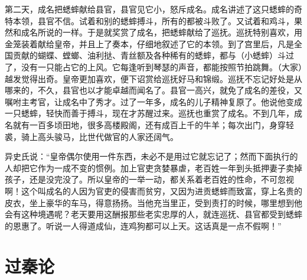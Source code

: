 \documentclass[12pt,UTF-8,openany,a4]{ctexbook}
\begin{document}
\begin{large}
    第二天，成名把蟋蟀献给县官，县官见它小，怒斥成名。成名讲述了这只蟋蟀的奇特本领，县官不信。试着和别的蟋蟀搏斗，所有的都被斗败了。又试着和鸡斗，果然和成名所说的一样。于是就奖赏了成名，把蟋蟀献给了巡抚。巡抚特别喜欢，用金笼装着献给皇帝，并且上了奏本，仔细地叙述了它的本领。到了宫里后，凡是全国贡献的蝴蝶、螳螂、油利挞、青丝额及各种稀有的蟋蟀，都与（小蟋蟀）斗过了，没有一只能占它的上风。它每逢听到琴瑟的声音，都能按照节拍跳舞。（大家）越发觉得出奇。皇帝更加喜欢，便下诏赏给巡抚好马和锦缎。巡抚不忘记好处是从哪来的，不久，县官也以才能卓越而闻名了。县官一高兴，就免了成名的差役，又嘱咐主考官，让成名中了秀才。过了一年多，成名的儿子精神复原了。他说他变成一只蟋蟀，轻快而善于搏斗，现在才苏醒过来。巡抚也重赏了成名。不到几年，成名就有一百多顷田地，很多高楼殿阁，还有成百上千的牛羊；每次出门，身穿轻裘，骑上高头骏马，比世代做官的人家还阔气。
    
    异史氏说：“皇帝偶尔使用一件东西，未必不是用过它就忘记了；然而下面执行的人却把它作为一成不变的惯例。加上官吏贪婪暴虐，老百姓一年到头抵押妻子卖掉孩子，还是没完没了。所以皇帝的一举一动，都关系着老百姓的性命，不可忽视啊！这个叫成名的人因为官吏的侵害而贫穷，又因为进贡蟋蟀而致富，穿上名贵的皮衣，坐上豪华的车马，得意扬扬。当他充当里正，受到责打的时候，哪里想到他会有这种境遇呢？老天要用这酬报那些老实忠厚的人，就连巡抚、县官都受到蟋蟀的恩惠了。听说一人得道成仙，连鸡狗都可以上天。这话真是一点不假啊！”
    
\end{large}



\chapter{过秦论}
\end{document}

